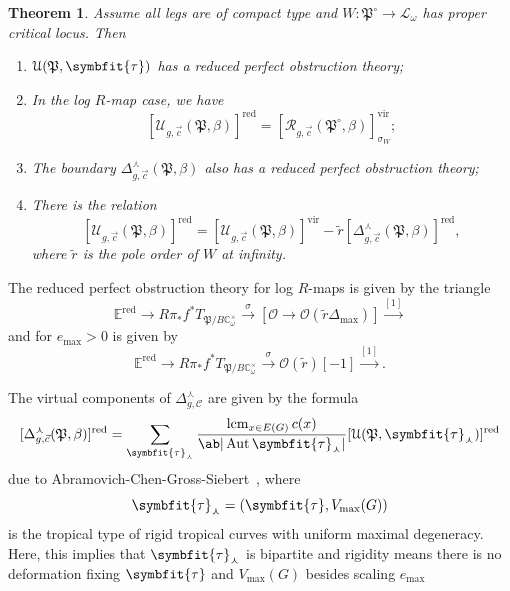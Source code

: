 \documentclass[10pt,oldfontcommands,oneside]{memoir}
\newtheorem{thm}{Theorem}[section]
\theoremstyle{definition}
\theoremstyle{remark}
\theoremstyle{plain}
\theoremstyle{definition}
\theoremstyle{remark}
\newcommand{\C}{\mathbb{C}}
\newcommand{\E}{\mathbb{E}}
\newcommand{\mc}[1]{\mathcal{#1}}
\newcommand{\mf}[1]{\mathfrak{#1}}
\newcommand{\btau}{\symbfit{\tau}}
\newcommand{\mr}[1]{\mathrm{#1}}
\newcommand{\on}[1]{\operatorname{#1}}
\newcommand{\1}{\mathbf{1}}
\newcommand{\2}{\mathbf{2}}
\newcommand{\3}{\mathbf{3}}
\newcommand{\vir}{\mr{vir}}
\DeclareMathOperator{\Aut}{Aut}
\begin{document}
\begin{thm}
    Assume all legs are of compact type and $W \colon \mf{P}^{\circ} \to \mc{L}_{\omega}$ has proper critical locus. Then
    \begin{enumerate}
        \item $\mc{U}(\mf{P},\btau)$ has a reduced perfect obstruction theory;
        \item In the log $R$-map case, we have
            \[ [\mc{U}_{g, \vec{c}}(\mf{P},\beta)]^{\on{red}} = [\mc{R}_{g,\vec{c}}(\mf{P}^{\circ}, \beta)]^{\vir}_{\sigma_W}; \]
        \item The boundary $\Delta_{g, \vec{c}}^{\curlywedge}(\mf{P}, \beta)$ also has a reduced perfect obstruction theory;
        \item There is the relation
            \[ [\mc{U}_{g, \vec{c}}(\mf{P}, \beta)]^{\on{red}} = [\mc{U}_{g, \vec{c}}(\mf{P}, \beta)]^{\vir} - \tilde{r} [\Delta^{\curlywedge}_{g, \vec{c}}(\mf{P}, \beta)]^{\on{red}}, \]
            where $\tilde{r}$ is the pole order of $W$ at infinity.
    \end{enumerate}
\end{thm}

The reduced perfect obstruction theory for log $R$-maps is given by the triangle
\[ \E^{\on{red}} \to R \pi_* f^* T_{\mf{P}/B\C_{\omega}^{\times}} \xrightarrow{\sigma} [\mc{O} \to \mc{O}(\tilde{r}\Delta_{\max})] \xrightarrow{[1]} \]
and for $e_{\max} > 0$ is given by
\[ \E^{\on{red}} \to R \pi_* f^* T_{\mf{P}/B\C_{\omega}^{\times}} \xrightarrow{\sigma} \mc{O}(\tilde{r})[-1] \xrightarrow{[1]}. \]

The virtual components of $\Delta_{g,\mc{C}}^{\curlywedge}$ are given by the formula
\[ [\Delta_{g, \vec{c}}^{\curlywedge}(\mf{P}, \beta)]^{\on{red}} = \sum_{\btau_{\curlywedge}} \frac{\on{lcm}_{x\in E(G)} c(x)}{\ab|\Aut \btau_{\curlywedge}|} [\mc{U}(\mf{P}, \btau_{\curlywedge})]^{\on{red}} \]
due to Abramovich-Chen-Gross-Siebert~\cite{puncturedlog}, where
\[ \btau_{\curlywedge} = (\btau, V_{\max}(G)) \]
is the tropical type of rigid tropical curves with uniform maximal degeneracy. Here, this implies that $\btau_{\curlywedge}$ is bipartite and rigidity means there is no deformation fixing $\btau$ and $V_{\max}(G)$ besides scaling $e_{\max}$
\end{document}
